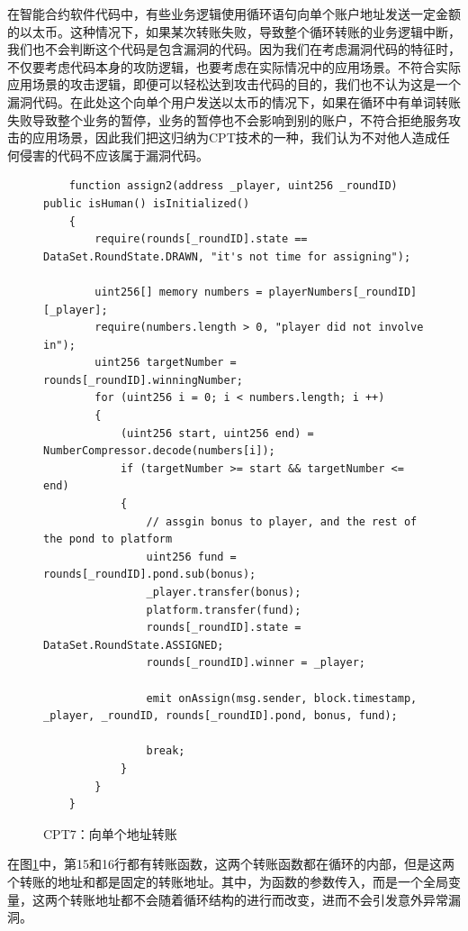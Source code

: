 在智能合约软件代码中，有些业务逻辑使用循环语句向单个账户地址发送一定金额的以太币。这种情况下，如果某次转账失败，导致整个循环转账的业务逻辑中断，我们也不会判断这个代码是包含漏洞的代码。因为我们在考虑漏洞代码的特征时，不仅要考虑代码本身的攻防逻辑，也要考虑在实际情况中的应用场景。不符合实际应用场景的攻击逻辑，即便可以轻松达到攻击代码的目的，我们也不认为这是一个漏洞代码。在此处这个向单个用户发送以太币的情况下，如果在循环中有单词转账失败导致整个业务的暂停，业务的暂停也不会影响到别的账户，不符合拒绝服务攻击的应用场景，因此我们把这归纳为CPT技术的一种，我们认为不对他人造成任何侵害的代码不应该属于漏洞代码。
\begin{figure}
\begin{minipage}[htbp]{1.0\linewidth}
    \begin{lstlisting}
    function assign2(address _player, uint256 _roundID) public isHuman() isInitialized()
    {
        require(rounds[_roundID].state == DataSet.RoundState.DRAWN, "it's not time for assigning");

        uint256[] memory numbers = playerNumbers[_roundID][_player];
        require(numbers.length > 0, "player did not involve in");
        uint256 targetNumber = rounds[_roundID].winningNumber;
        for (uint256 i = 0; i < numbers.length; i ++)
        {
            (uint256 start, uint256 end) = NumberCompressor.decode(numbers[i]);
            if (targetNumber >= start && targetNumber <= end)
            {
                // assgin bonus to player, and the rest of the pond to platform
                uint256 fund = rounds[_roundID].pond.sub(bonus);
                _player.transfer(bonus);
                platform.transfer(fund);
                rounds[_roundID].state = DataSet.RoundState.ASSIGNED;
                rounds[_roundID].winner = _player;

                emit onAssign(msg.sender, block.timestamp, _player, _roundID, rounds[_roundID].pond, bonus, fund);

                break;
            }
        }
    }
    \end{lstlisting}
\end{minipage}
\vspace{-5mm}
\caption{CPT7：向单个地址转账}
\label{fig:ss7_example}
\end{figure}

在图\ref{fig:ss7_example}中，第15和16行都有转账函数，这两个转账函数都在循环的内部，但是这两个转账的地址和都是固定的转账地址。其中，为函数的参数传入，而是一个全局变量，这两个转账地址都不会随着循环结构的进行而改变，进而不会引发意外异常漏洞。

